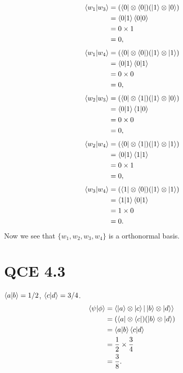 \documentclass[10pt]{article}
\begin{document}
\begin{align*}
\braket{ w_1 | w_3  } &= ( \bra{ 0 } \otimes \bra{ 0 } ) ( \ket{ 1 } \otimes \ket{ 0 } ) \\
 					&= \braket{ 0 | 1 } \braket{ 0 | 0 } \\
 					&= 0 \times 1 \\
 					&= 0,
\end{align*}
\begin{align*}
\braket{ w_1 | w_4  } &= ( \bra{ 0 } \otimes \bra{ 0 } ) ( \ket{ 1 } \otimes \ket{ 1 } ) \\
 					&= \braket{ 0 | 1 } \braket{ 0 | 1 } \\
 					&= 0 \times 0 \\
 					&= 0,
\end{align*}
\begin{align*}
\braket{ w_2 | w_3  } &= ( \bra{ 0 } \otimes \bra{ 1 } ) ( \ket{ 1 } \otimes \ket{ 0 } ) \\
 					&= \braket{ 0 | 1 } \braket{ 1 | 0 } \\
 					&= 0 \times 0 \\
 					&= 0,
\end{align*}
\begin{align*}
\braket{ w_2 | w_4  } &= ( \bra{ 0 } \otimes \bra{ 1 } ) ( \ket{ 1 } \otimes \ket{ 1 } ) \\
 					&= \braket{ 0 | 1 } \braket{ 1 | 1 } \\
 					&= 0 \times 1 \\
 					&= 0,
\end{align*}
\begin{align*}
\braket{ w_3 | w_4  } &= ( \bra{ 1 } \otimes \bra{ 0 } ) ( \ket{ 1 } \otimes \ket{ 1 } ) \\
 					&= \braket{ 1 | 1 } \braket{ 0 | 1 } \\
 					&= 1 \times 0 \\
 					&= 0.
\end{align*}
Now we see that $\{ w_1, w_2, w_3, w_4 \}$ is a orthonormal basis.

\section*{QCE 4.3}
$\braket{a | b} = 1/2$, $\braket{c | d} = 3/4$. 
\begin{align*}
\braket{ \psi | \phi} &= \braket{ \ket{a} \otimes \ket{c} | \ket{b} \otimes \ket{d} } \\
								&= (\bra{a} \otimes \bra{c}) ( \ket{b} \otimes \ket{d} ) \\
								&= \braket{a | b} \braket{c | d} \\
								&= \frac{1}{2} \times \frac{3}{4} \\
								&= \frac{3}{8}.
\end{align*}
\end{document}
